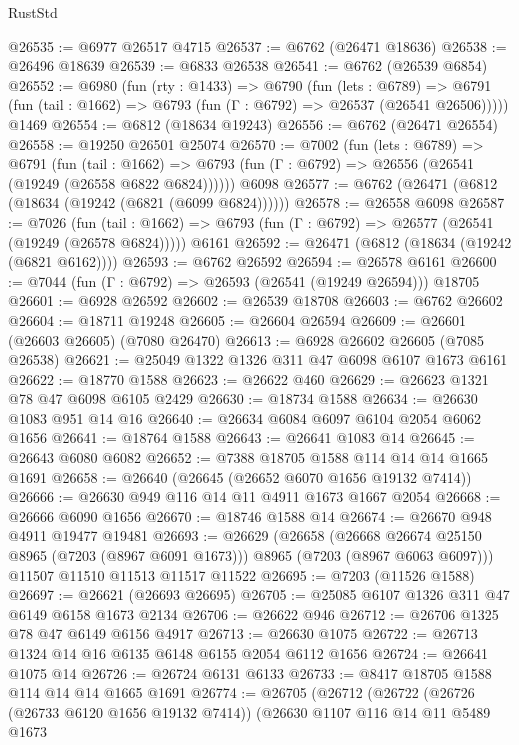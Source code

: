 \begin{lexlean}{RustStd}
\begin{coremodule}
@26535 := @6977 @26517 @4715
@26537 := @6762 (@26471 @18636)
@26538 := @26496 @18639
@26539 := @6833 @26538
@26541 := @6762 (@26539 @6854)
@26552 := @6980
    (fun (rty : @1433) =>
    @6790
      (fun (lets : @6789) =>
      @6791 (fun (tail : @1662) => @6793 (fun (Γ : @6792) => @26537 (@26541 @26506)))))
    @1469
@26554 := @6812 (@18634 @19243)
@26556 := @6762 (@26471 @26554)
@26558 := @19250 @26501 @25074
@26570 := @7002
    (fun (lets : @6789) =>
    @6791
      (fun (tail : @1662) =>
      @6793 (fun (Γ : @6792) => @26556 (@26541 (@19249 (@26558 @6822 @6824))))))
    @6098
@26577 := @6762 (@26471 (@6812 (@18634 (@19242 (@6821 (@6099 @6824))))))
@26578 := @26558 @6098
@26587 := @7026
    (fun (tail : @1662) => @6793 (fun (Γ : @6792) => @26577 (@26541 (@19249 (@26578 @6824)))))
    @6161
@26592 := @26471 (@6812 (@18634 (@19242 (@6821 @6162))))
@26593 := @6762 @26592
@26594 := @26578 @6161
@26600 := @7044 (fun (Γ : @6792) => @26593 (@26541 (@19249 @26594))) @18705
@26601 := @6928 @26592
@26602 := @26539 @18708
@26603 := @6762 @26602
@26604 := @18711 @19248
@26605 := @26604 @26594
@26609 := @26601 (@26603 @26605) (@7080 @26470)
@26613 := @6928 @26602 @26605 (@7085 @26538)
@26621 := @25049 @1322 @1326 @311 @47 @6098 @6107 @1673 @6161
@26622 := @18770 @1588
@26623 := @26622 @460
@26629 := @26623 @1321 @78 @47 @6098 @6105 @2429
@26630 := @18734 @1588
@26634 := @26630 @1083 @951 @14 @16
@26640 := @26634 @6084 @6097 @6104 @2054 @6062 @1656
@26641 := @18764 @1588
@26643 := @26641 @1083 @14
@26645 := @26643 @6080 @6082
@26652 := @7388 @18705 @1588 @114 @14 @14 @1665 @1691
@26658 := @26640 (@26645 (@26652 @6070 @1656 @19132 @7414))
@26666 := @26630 @949 @116 @14 @11 @4911 @1673 @1667 @2054
@26668 := @26666 @6090 @1656
@26670 := @18746 @1588 @14
@26674 := @26670 @948 @4911 @19477 @19481
@26693 := @26629
    (@26658
      (@26668 @26674 @25150 @8965 (@7203 (@8967 @6091 @1673)))
      @8965
      (@7203 (@8967 @6063 @6097)))
    @11507
    @11510
    @11513
    @11517
    @11522
@26695 := @7203 (@11526 @1588)
@26697 := @26621 (@26693 @26695)
@26705 := @25085 @6107 @1326 @311 @47 @6149 @6158 @1673 @2134
@26706 := @26622 @946
@26712 := @26706 @1325 @78 @47 @6149 @6156 @4917
@26713 := @26630 @1075
@26722 := @26713 @1324 @14 @16 @6135 @6148 @6155 @2054 @6112 @1656
@26724 := @26641 @1075 @14
@26726 := @26724 @6131 @6133
@26733 := @8417 @18705 @1588 @114 @14 @14 @1665 @1691
@26774 := @26705
    (@26712
      (@26722
        (@26726 (@26733 @6120 @1656 @19132 @7414))
        (@26630
          @1107
          @116
          @14
          @11
          @5489
          @1673

\end{coremodule}
\end{lexlean}
